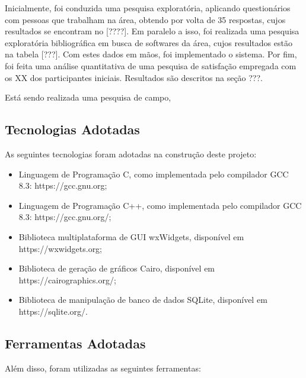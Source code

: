 \documentclass{subfiles}
\begin{document}
	\par Inicialmente, foi conduzida uma pesquisa exploratória, aplicando questionários com pessoas que trabalham na área, obtendo por volta de 35 respostas, cujos resultados se encontram no [????]. Em paralelo a isso, foi realizada uma pesquisa exploratória bibliográfica em busca de softwares da área, cujos resultados estão na tabela [???]. Com estes dados em mãos, foi implementado o sistema. Por fim, foi feita uma análise quantitativa de uma pesquisa de satisfação empregada com os XX dos participantes iniciais. Resultados são descritos na seção ???.

	\par Está sendo realizada uma pesquisa de campo,

	\subsection{Tecnologias Adotadas}

		\par As seguintes tecnologias foram adotadas na construção deste projeto:

		\begin{itemize}
			\item Linguagem de Programação C, como implementada pelo compilador GCC 8.3: https://gcc.gnu.org;
			\item Linguagem de Programação C++, como implementada pelo compilador GCC 8.3: https://gcc.gnu.org/;
			\item Biblioteca multiplataforma de GUI wxWidgets, disponível em https://wxwidgets.org;
			\item Biblioteca de geração de gráficos Cairo, disponível em https://cairographics.org/;
			\item Biblioteca de manipulação de banco de dados SQLite, disponível em https://sqlite.org/.
		\end{itemize}

	\subsection{Ferramentas Adotadas}

		\par Além disso, foram utilizadas as seguintes ferramentas:
\end{document}
